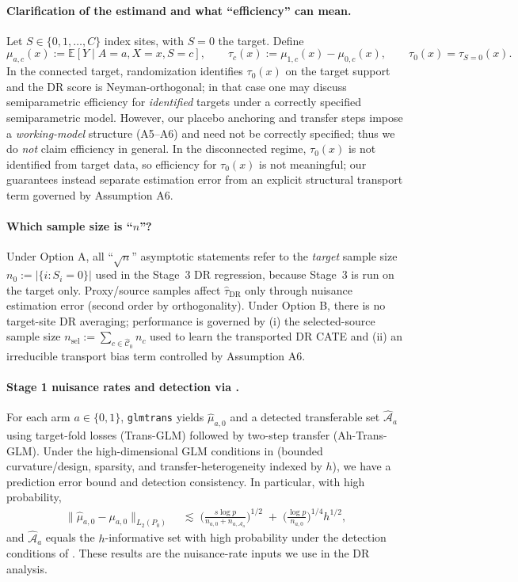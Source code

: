 {\paragraph{Clarification of the estimand and what ``efficiency'' can mean.}
Let $S\in\{0,1,\dots,C\}$ index sites, with $S=0$ the target. Define
\[
\mu_{a,c}(x):=\mathbb{E}[Y\mid A=a,X=x,S=c],
\qquad
\tau_c(x):=\mu_{1,c}(x)-\mu_{0,c}(x),
\qquad
\tau_0(x)=\tau_{S=0}(x).
\]
In the connected target, randomization identifies $\tau_0(x)$ on the target support and the DR score is Neyman-orthogonal; in that case one may discuss semiparametric efficiency for \emph{identified} targets under a correctly specified semiparametric model. However, our placebo anchoring and transfer steps impose a \emph{working-model} structure (A5--A6) and need not be correctly specified; thus we do \emph{not} claim efficiency in general. In the disconnected regime, $\tau_0(x)$ is not identified from target data, so efficiency for $\tau_0(x)$ is not meaningful; our guarantees instead separate estimation error from an explicit structural transport term governed by Assumption A6.

\paragraph{Which sample size is ``$n$''?}
Under Option A, all ``$\sqrt{n}$'' asymptotic statements refer to the \emph{target} sample size $n_0:=|\{i:S_i=0\}|$ used in the Stage~3 DR regression, because Stage~3 is run on the target only. Proxy/source samples affect $\widehat\tau_{\mathrm{DR}}$ only through nuisance estimation error (second order by orthogonality). Under Option B, there is no target-site DR averaging; performance is governed by (i) the selected-source sample size $n_{\mathrm{sel}}:=\sum_{c\in\widehat{\mathcal{C}}_0} n_c$ used to learn the transported DR CATE and (ii) an irreducible transport bias term controlled by Assumption A6.

\paragraph{Stage 1 nuisance rates and detection via \cite{tian2023transfer}.}
For each arm $a\in\{0,1\}$, \texttt{glmtrans} yields $\widehat\mu_{a,0}$ and a detected transferable set $\widehat{\mathcal{A}}_a$ using target-fold losses (Trans-GLM) followed by two-step transfer (Ah-Trans-GLM). Under the high-dimensional GLM conditions in \cite{tian2023transfer} (bounded curvature/design, sparsity, and transfer-heterogeneity indexed by $h$), we have a prediction error bound and detection consistency. In particular, with high probability,
\begin{align*}
\|\widehat\mu_{a,0}-\mu_{a,0}\|_{L_2(P_0)}
\;&\lesssim\;
\Big(\frac{s\log p}{n_{a,0}+n_{a,\mathcal{A}_a}}\Big)^{1/2}
\;+\;
\Big(\frac{\log p}{n_{a,0}}\Big)^{1/4} h^{1/2},
\end{align*}
and $\widehat{\mathcal{A}}_a$ equals the $h$-informative set with high probability under the detection conditions of \cite{tian2023transfer}. These results are the nuisance-rate inputs we use in the DR analysis.

}
